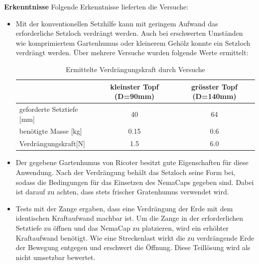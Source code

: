 \textbf{Erkenntnisse}
\newline
Folgende Erkenntnisse lieferten die Versuche:
\begin{itemize}
	\item Mit der konventionellen Setzhilfe kann mit geringem Aufwand das erforderliche Setzloch verdrängt werden. Auch bei erschwerten Umständen wie komprimiertem Gartenhumus oder kleinerem Gehölz konnte ein Setzloch verdrängt werden. Über mehrere Versuche wurden folgende Werte ermittelt:
\begin{table}[H]
	\begin{tabular}{|l|c|c|}
		\hline 
		& kleinster Topf (D=90mm) & grösster Topf (D=140mm) \\ 
		\hline 
		geforderte Setztiefe [mm] & 40 & 64 \\ 
		\hline 
		benötigte Masse [kg] & 0.15 & 0.6 \\ 
		\hline 
		Verdrängungskraft[N] & 1.5  & 6.0  \\ 
		\hline 
	\end{tabular} 
	\caption{Ermittelte Verdrängungskraft durch Versuche}
	\label{tab:verdraengungskraft}
\end{table}	
	
	\item Der gegebene Gartenhumus von Ricoter besitzt gute Eigenschaften für diese Anwendung. Nach der Verdrängung behält das Setzloch seine Form bei, sodass die Bedingungen für das Einsetzen des NemaCaps gegeben sind. Dabei ist darauf zu achten, dass stets frischer Gratenhumus verwendet wird.
	
	\item Tests mit der Zange ergaben, dass eine Verdrängung der Erde mit dem identischen Kraftaufwand machbar ist. Um die Zange in der erforderlichen Setztiefe zu öffnen und das NemaCap zu platzieren, wird ein erhöhter Kraftaufwand benötigt. Wie eine Streckenlast wirkt die zu verdrängende Erde der Bewegung entgegen und erschwert die Öffnung. Diese Teillösung wird als nicht umsetzbar bewertet.
\end{itemize} 

